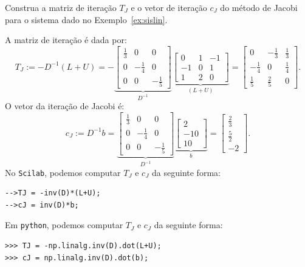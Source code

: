 \begin{ex}
  Construa a matriz de iteração $T_J$ e o vetor de iteração $c_J$ do método de Jacobi para o sistema dado no Exemplo~\ref{ex:sislin}.
\end{ex}
\begin{sol}
  A matriz de iteração é dada por:
  \begin{equation*}
    T_J := -D^{-1}(L + U) = -
    \underbrace{\begin{bmatrix}
      \frac{1}{3} & 0 & 0\\
      0 & -\frac{1}{4} & 0\\
      0 & 0 & -\frac{1}{5}
    \end{bmatrix}}_{D^{-1}}
  \underbrace{\begin{bmatrix}
    0 & 1 & -1\\
    -1 & 0 & 1\\
    1 & 2 & 0
  \end{bmatrix}}_{(L + U)} =
\begin{bmatrix}
  0 & -\frac{1}{3} & \frac{1}{3}\\
  -\frac{1}{4} & 0 & \frac{1}{4}\\
  \frac{1}{5} & \frac{2}{5} & 0
\end{bmatrix}.
  \end{equation*}
O vetor da iteração de Jacobi é:
\begin{equation*}
  c_J := D^{-1}b =
    \underbrace{\begin{bmatrix}
      \frac{1}{3} & 0 & 0\\
      0 & -\frac{1}{4} & 0\\
      0 & 0 & -\frac{1}{5}
    \end{bmatrix}}_{D^{-1}}
    \underbrace{\begin{bmatrix}
      2\\
      -10\\
      10
    \end{bmatrix}}_{b} =
    \begin{bmatrix}
      \frac{2}{3}\\
      \frac{5}{2}\\
      -2
    \end{bmatrix}.
\end{equation*}
\ifisscilab
No \verb+Scilab+, podemos computar $T_J$ e $c_J$ da seguinte forma:
\begin{verbatim}
-->TJ = -inv(D)*(L+U);
-->cJ = inv(D)*b;
\end{verbatim}
\fi
\ifispython
Em \verb+python+, podemos computar $T_J$ e $c_J$ da seguinte forma:
\begin{verbatim}
>>> TJ = -np.linalg.inv(D).dot(L+U);
>>> cJ = np.linalg.inv(D).dot(b);
\end{verbatim}
\fi
\end{sol}

